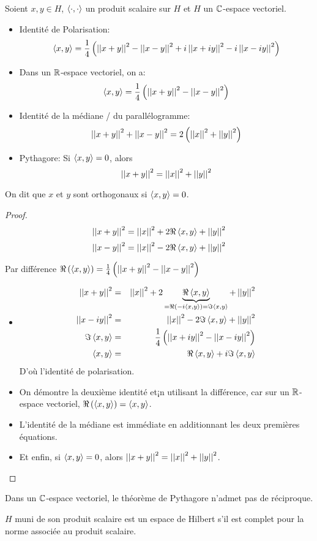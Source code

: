 \begin{prop}
	Soient $x,y \in H$, $\left\langle \cdot, \cdot \right\rangle$ un produit scalaire sur $H$ et $H$ un $\mathbb{C}$-espace vectoriel.

	\begin{itemize}
		\item Identité de Polarisation:
		      $$\left\langle x, y \right\rangle = \frac{1}{4} \left( \left|\left|x+y\right|\right|^2 - \left|\left|x-y\right|\right|^2 + i\left|\left|x+iy\right|\right|^2 - i\left|\left|x-iy\right|\right|^2 \right)$$
		\item Dans un $\mathbb{R}$-espace vectoriel, on a:
		      $$\left\langle x, y \right\rangle = \frac{1}{4} \left( \left|\left|x+y\right|\right|^2 - \left|\left|x-y\right|\right|^2 \right)$$
		\item Identité de la médiane / du parallélogramme:
		      $$\left|\left|x+y\right|\right|^2 + \left|\left|x-y\right|\right|^2 = 2\left( \left|\left|x\right|\right|^2 + \left|\left|y\right|\right|^2 \right)$$
		\item Pythagore: Si $\left\langle x, y \right\rangle = 0$, alors
		      $$ \left|\left|x+y\right|\right|^2 = \left|\left|x\right|\right|^2 + \left|\left|y\right|\right|^2$$
	\end{itemize}
\end{prop}

\begin{definition}
	On dit que $x$ et $y$ sont orthogonaux si $\left\langle x, y \right\rangle = 0$.
\end{definition}

\begin{proof}
	$$\left|\left|x+y\right|\right|^2  = \left|\left|x\right|\right|^2 + 2\Re \left\langle x, y \right\rangle + \left|\left|y\right|\right|^2 $$
	$$\left|\left|x-y\right|\right|^2  = \left|\left|x\right|\right|^2 - 2\Re \left\langle x, y \right\rangle + \left|\left|y\right|\right|^2 $$

	Par différence $\Re \left(\left\langle x, y \right\rangle\right) = \frac{1}{4} \left( \left|\left|x+y\right|\right|^2 - \left|\left|x-y\right|\right|^2 \right)$
	\begin{itemize}
		\item
		      \begin{eqnarray*}
			      \left|\left|x+y\right|\right|^2  &=& \left|\left|x\right|\right|^2 + 2\underbrace{\Re \left\langle x, y \right\rangle }_{= \Re (-i\left\langle x, y \right\rangle) = \Im \left\langle x, y \right\rangle} + \left|\left|y\right|\right|^2 \\
			      \left|\left|x-iy\right|\right|^2 &=& \left|\left|x\right|\right|^2 - 2\Im \left\langle x, y \right\rangle + \left|\left|y\right|\right|^2 \\
			      \Im \left\langle x, y \right\rangle &=& \frac{1}{4} \left( \left|\left|x+iy\right|\right|^2 - \left|\left|x-iy\right|\right|^2 \right)\\
			      \left\langle x, y \right\rangle &=& \Re \left\langle x, y \right\rangle + i \Im \left\langle x, y \right\rangle
		      \end{eqnarray*}
		      D'où l'identité de polarisation.
		\item On démontre la deuxième identité et¡n utilisant la différence, car sur un $\mathbb{R}$-espace vectoriel, $\Re \left(\left\langle x, y \right\rangle\right) = \left\langle x, y \right\rangle$.
		\item L'identité de la médiane est immédiate en additionnant les deux premières équations.
		\item Et enfin, si $\left\langle x, y \right\rangle = 0$, alors $\left|\left|x+y\right|\right|^2 = \left|\left|x\right|\right|^2 + \left|\left|y\right|\right|^2$.
	\end{itemize} %
\end{proof}


\begin{remarque}
	Dans un $\mathbb{C}$-espace vectoriel, le théorème de Pythagore n'admet pas de réciproque.
\end{remarque}

\begin{definition}
	$H$ muni de son produit scalaire est un espace de Hilbert s'il est complet pour la norme associée au produit scalaire.
\end{definition}

